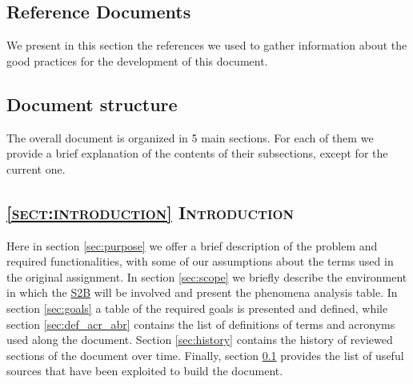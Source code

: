 \subsection{Reference Documents}
\label{sec:ref_docs}
We present in this section the references we used to gather information about the good practices for the development of this document.
\begingroup
\renewcommand{\section}[2]{}%
\nocite{*}


\endgroup





\subsection{Document structure}
\label{sec:doc_struct}
The overall document is organized in 5 main sections. For each of them we provide a brief explanation of the contents of their subsections, except for the current one.

\subsection*{\textsc{\textcolor{myblue}{\ref{sect:introduction} Introduction}}}
Here in section \ref{sec:purpose} we offer a brief description of the problem and required functionalities, with some of our assumptions about the terms used in the original assignment. In section \ref{sec:scope} we briefly describe the environment in which the \hyperref[tab:def]{S2B} will be involved and present the phenomena analysis table.
In section \ref{sec:goals} a table of the required goals is presented and defined, while section \ref{sec:def_acr_abr} contains the list of definitions of terms and acronyms used along the document. Section \ref{sec:history} contains the history of reviewed sections of the document over time. Finally, section \ref{sec:ref_docs} provides the list of useful sources that have been exploited to build the document.

